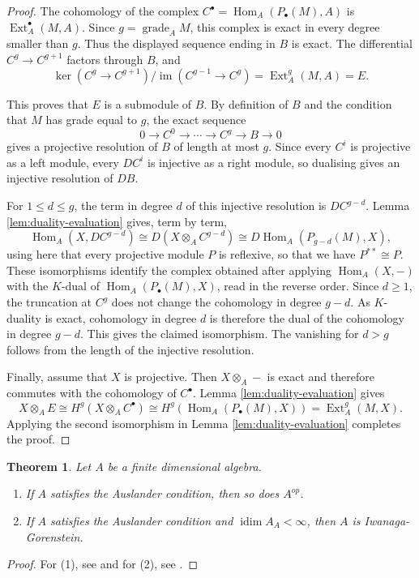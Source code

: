 \documentclass[a4paper]{amsart}
\newtheorem{theorem}{Theorem}[section]
\theoremstyle{definition}
\theoremstyle{remark}
\numberwithin{equation}{section}
\newcommand{\Ext}{\operatorname{Ext}}
\newcommand{\idim}{\operatorname{idim}}
\newcommand{\gr}{\operatorname{grade}}
\newcommand{\Hom}{\operatorname{Hom}}
\begin{document}
\begin{proof}
The cohomology of the complex $C^\bullet=\Hom_A(P_\bullet(M),A)$ is $\Ext_A^\bullet(M,A)$. Since $g=\gr_A M$, this complex is exact in every degree smaller than $g$. Thus the displayed sequence ending in $B$ is exact. The differential $C^g\to C^{g+1}$ factors through $B$, and
\[
 \ker(C^g\to C^{g+1})/\operatorname{im}(C^{g-1}\to C^g)
 =\Ext_A^g(M,A)=E.
\]

This proves that $E$ is a submodule of $B$. By definition of $B$ and the condition that $M$ has grade equal to $g$, the exact sequence
\[
 0\longrightarrow C^0\longrightarrow\cdots\longrightarrow C^g
 \longrightarrow B\longrightarrow 0
\]
gives a projective resolution of $B$ of length at most $g$. Since every $C^i$ is projective as a left module, every $DC^i$ is injective as a right module, so dualising gives an injective resolution of $DB$.

For $1\leq d\leq g$, the term in degree $d$ of this injective resolution is $DC^{g-d}$. Lemma \ref{lem:duality-evaluation} gives, term by term,
\[
 \Hom_A(X,DC^{g-d})\cong D(X\otimes_A C^{g-d})
 \cong D\Hom_A(P_{g-d}(M),X),
\] using here that every projective module $P$ is reflexive, so that we have $P^{**} \cong P$.
These isomorphisms identify the complex obtained after applying $\Hom_A(X,-)$ with the $K$-dual of $\Hom_A(P_\bullet(M),X)$, read in the reverse order. Since $d\geq 1$, the truncation at $C^g$ does not change the cohomology in degree $g-d$. As $K$-duality is exact, cohomology in degree $d$ is therefore the dual of the cohomology in degree $g-d$. This gives the claimed isomorphism. The vanishing for $d>g$ follows from the length of the injective resolution.

Finally, assume that $X$ is projective. Then $X\otimes_A-$ is exact and therefore commutes with the cohomology of $C^\bullet$. Lemma \ref{lem:duality-evaluation} gives
\[
 X\otimes_A E\cong H^g(X\otimes_A C^\bullet)
 \cong H^g(\Hom_A(P_\bullet(M),X))
 =\Ext_A^g(M,X).
\]
Applying the second isomorphism in Lemma \ref{lem:duality-evaluation} completes the proof.
\end{proof}

\begin{theorem} \label{FGRandARresults}
Let $A$ be a finite dimensional algebra.
\begin{enumerate}
    \item If $A$ satisfies the Auslander condition, then so does $A^{op}$.
    \item If $A$ satisfies the Auslander condition and $\idim A_A < \infty$, then $A$ is Iwanaga-Gorenstein.
\end{enumerate}
\end{theorem}
\begin{proof}
For (1), see \cite[Theorem 3.7]{FGR} and for (2), see \cite[Corollary 5.5 (b)]{AR}.
\end{proof}
\end{document}
